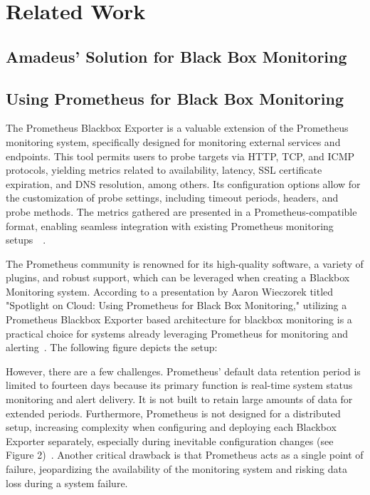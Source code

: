 
\chapter{Related Work}\label{chapter:related_work}

\section{Amadeus' Solution for Black Box Monitoring}

\section{Using Prometheus for Black Box Monitoring}

The Prometheus Blackbox Exporter is a valuable extension of the Prometheus monitoring system, specifically designed for monitoring external services and endpoints. This tool permits users to probe targets via HTTP, TCP, and ICMP protocols, yielding metrics related to availability, latency, SSL certificate expiration, and DNS resolution, among others. Its configuration options allow for the customization of probe settings, including timeout periods, headers, and probe methods. The metrics gathered are presented in a Prometheus-compatible format, enabling seamless integration with existing Prometheus monitoring setups~\parencite{prometheusOverviewPrometheus}~\parencite{prometheusBlackboxExporter2023}. 

The Prometheus community is renowned for its high-quality software, a variety of plugins, and robust support, which can be leveraged when creating a Blackbox Monitoring system. According to a presentation by Aaron Wieczorek titled "Spotlight on Cloud: Using Prometheus for Black Box Monitoring," utilizing a Prometheus Blackbox Exporter based architecture for blackbox monitoring is a practical choice for systems already leveraging Prometheus for monitoring and alerting~\parencite{oreillySpotlightCloudUsing}. The following figure depicts the setup: 

However, there are a few challenges. Prometheus' default data retention period is limited to fourteen days because its primary function is real-time system status monitoring and alert delivery. It is not built to retain large amounts of data for extended periods. Furthermore, Prometheus is not designed for a distributed setup, increasing complexity when configuring and deploying each Blackbox Exporter separately, especially during inevitable configuration changes (see Figure 2)~\parencite{prometheusOverviewPrometheus}. Another critical drawback is that Prometheus acts as a single point of failure, jeopardizing the availability of the monitoring system and risking data loss during a system failure. 

